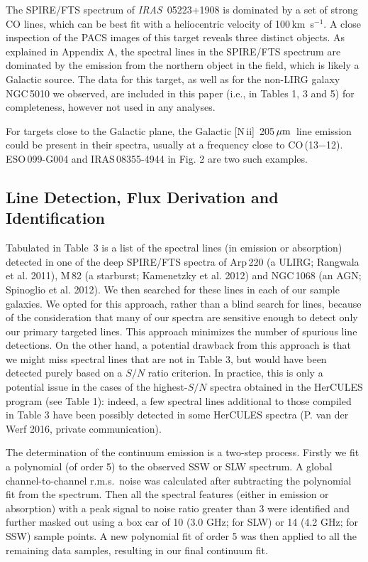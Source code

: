 \documentclass[preprint]{aastex}
\newcommand{\um}{\mbox{$\,\mu{\rm m}$}}
\newcommand{\kms}{\mbox{\,km~s$^{-1}$}}
\newcommand{\IRAS}{{\it IRAS}}
\newcommand{\NII}{\mbox{[N\,{\sc ii}]}}
\begin{document}
The SPIRE/FTS spectrum of \IRAS\ 05223+1908 is dominated by a set of strong CO lines, 
which can be best fit with a heliocentric velocity of 100\kms.  A close inspection 
of the PACS images of this target reveals three distinct 
objects.  As explained in Appendix A, the spectral lines in the SPIRE/FTS spectrum 
are dominated by the emission from the northern object in the field, which is likely
a Galactic source.  The data for this target, as well as for the non-LIRG galaxy NGC\,5010 
we observed, are included in this paper (i.e., in Tables 1, 3 and 5) for completeness, 
however not used in any analyses.

For targets close to the Galactic plane, the Galactic \NII\ 205\um\ line emission 
could be present in their spectra, usually at a frequency close to CO\,(13$-$12). 
ESO\,099-G004 and IRAS\,08355-4944 in Fig. 2 are two such examples.




\subsection{Line Detection, Flux Derivation and Identification} \label{sec3.4}


Tabulated in Table~3 is a list of the spectral lines (in emission or absorption)
detected in one of the deep SPIRE/FTS spectra of Arp\,220 (a ULIRG; 
Rangwala et al. 2011), M\,82 (a starburst; Kamenetzky et al. 2012) and NGC\,1068 
(an AGN; Spinoglio et al. 2012).  We then searched for these lines in each of our
sample galaxies.  We opted for this approach, rather than a blind search
for lines, because of the consideration that many of our spectra are 
sensitive enough to detect only our primary targeted lines.  This approach 
minimizes the number of spurious line detections.  On the other hand, a potential 
drawback from
this approach is that we might miss spectral lines that are not in Table 3, but 
would have been detected purely based on a $S/N$ ratio criterion.
In practice, this is only a potential issue in the cases of the highest-$S/N$ 
spectra obtained in the HerCULES program (see Table 1): indeed, a few spectral 
lines additional to those compiled in Table 3 have been possibly 
detected in some HerCULES spectra (P. van der Werf 2016, private communication).


The determination of the continuum emission is a two-step process. Firstly we fit 
a polynomial (of order 5) to the observed SSW or SLW spectrum.  A global 
channel-to-channel r.m.s.~noise was calculated after subtracting the polynomial fit 
from the spectrum.  Then all the spectral features (either in emission or absorption)
with a peak signal to noise ratio greater than 3 were identified and further 
masked out using a box car of 10 (3.0 GHz; for SLW) or 14 (4.2 GHz; for SSW) sample 
points.   A new polynomial fit of order 5 was then applied to all the remaining data 
samples, resulting in our final continuum fit.
\end{document}
